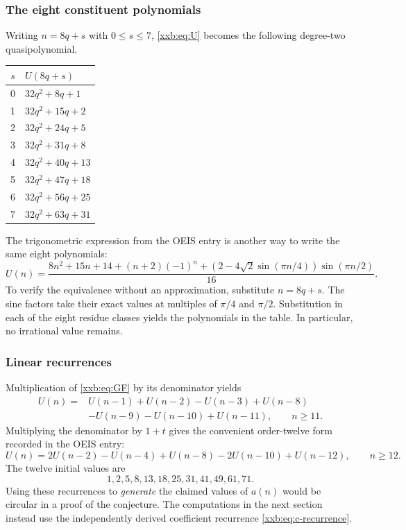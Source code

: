 \documentclass[11pt,a4paper]{article}
\numberwithin{equation}{section}
\theoremstyle{definition}
\theoremstyle{remark}
\theoremstyle{plain}
\newcommand{\U}{U}
\begin{document}
\subsubsection{The eight constituent polynomials}
Writing $n=8q+s$ with $0\le s\le7$, \eqref{xxb:eq:U} becomes the following
degree-two quasipolynomial.
\begin{center}
\begin{tabular}{cl}
\toprule
$s$ & $\U(8q+s)$\\
\midrule
0 & $32q^2+8q+1$\\
1 & $32q^2+15q+2$\\
2 & $32q^2+24q+5$\\
3 & $32q^2+31q+8$\\
4 & $32q^2+40q+13$\\
5 & $32q^2+47q+18$\\
6 & $32q^2+56q+25$\\
7 & $32q^2+63q+31$\\
\bottomrule
\end{tabular}
\end{center}
The trigonometric expression from the OEIS entry is another way to write
the same eight polynomials:
\begin{equation}\label{xxb:eq:trig}
 \U(n)=\frac{8n^2+15n+14+(n+2)(-1)^n
 +(2-4\sqrt2\sin(\pi n/4))\sin(\pi n/2)}{16}.
\end{equation}
To verify the equivalence without an approximation, substitute $n=8q+s$.
The sine factors take their exact values at multiples of $\pi/4$ and
$\pi/2$. Substitution in each of the eight residue classes yields the
polynomials in the table. In particular, no irrational value remains.

\subsubsection{Linear recurrences}
Multiplication of \eqref{xxb:eq:GF} by its denominator yields
\begin{equation}\label{xxb:eq:rec11}
 \begin{split}
 \U(n)={}&\U(n-1)+\U(n-2)-\U(n-3)+\U(n-8)\\
         &-\U(n-9)-\U(n-10)+\U(n-11),\qquad n\ge11.
 \end{split}
\end{equation}
Multiplying the denominator by $1+t$ gives the convenient order-twelve
form recorded in the OEIS entry:
\begin{equation}\label{xxb:eq:rec12}
 \U(n)=2\U(n-2)-\U(n-4)+\U(n-8)-2\U(n-10)+\U(n-12),
 \qquad n\ge12.
\end{equation}
The twelve initial values are
\[
 1,2,5,8,13,18,25,31,41,49,61,71.
\]
Using these recurrences to \emph{generate} the claimed values of $a(n)$
would be circular in a proof of the conjecture. The computations in the
next section instead use the independently derived coefficient recurrence
\eqref{xxb:eq:c-recurrence}.
\end{document}
